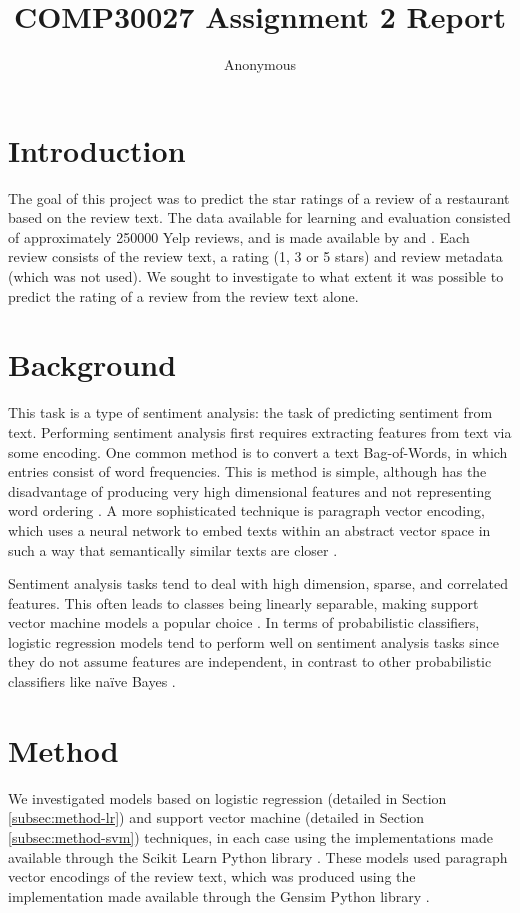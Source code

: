 \documentclass[11pt]{article}
\title{COMP30027 Assignment 2 Report}
\author
{Anonymous}
\begin{document}
\maketitle

\section{Introduction}
The goal of this project was to predict the star ratings of a review of a restaurant based on the review text. The data available for learning and evaluation consisted of approximately 250000 Yelp reviews, and is made available by \cite{medhat_sentiment_2014} and \cite{rayana_collective_2015}. Each review consists of the review text, a rating (1, 3 or 5 stars) and review metadata (which was not used). We sought to investigate to what extent it was possible to predict the rating of a review from the review text alone. 

\section{Background}
This task is a type of sentiment analysis: the task of predicting sentiment from text. Performing sentiment analysis first requires extracting features from text via some encoding. One common method is to convert a text Bag-of-Words, in which entries consist of word frequencies. This is method is simple, although has the disadvantage of producing very high dimensional features and not representing word ordering \cite{le_distributed_2014}. A more sophisticated technique is paragraph vector encoding, which uses a neural network to embed texts within an abstract vector space in such a way that semantically similar texts are closer \cite{le_distributed_2014}.

Sentiment analysis tasks tend to deal with high dimension, sparse, and correlated features. This often leads to classes being linearly separable, making support vector machine models a popular choice \cite{medhat_sentiment_2014}. In terms of probabilistic classifiers, logistic regression models tend to perform well on sentiment analysis tasks since they do not assume features are independent, in contrast to other probabilistic classifiers like na\"{i}ve Bayes \cite{medhat_sentiment_2014}.

\section{Method} \label{sec:method}
We investigated models based on logistic regression (detailed in Section \ref{subsec:method-lr}) and support vector machine (detailed in Section \ref{subsec:method-svm}) techniques, in each case using the implementations made available through the Scikit Learn Python library \cite{sklearn_pedregosa_scikit-learn_2011}. These models used paragraph vector encodings of the review text, which was produced using the implementation made available through the Gensim Python library \cite{gensim_rehurek_software_2010}. 
\end{document}

